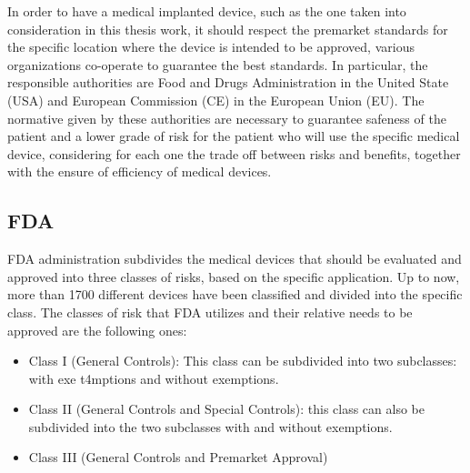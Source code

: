 \documentclass{Configuration_Files/PoliMi3i_thesis}
\begin{document}
In order to have a medical implanted device, such as the one taken into consideration in this thesis work, it should respect the premarket standards for the specific location where the device is intended to be approved, various organizations co-operate to guarantee the best standards. \cite{UWBioEUniversity2021} In particular, the responsible authorities are Food and Drugs Administration in the United State (USA) and European Commission (CE) in the European Union (EU). 
The normative given by these authorities are necessary to guarantee safeness of the patient and a lower grade of risk for the patient who will use the specific medical device, considering for each one the trade off between risks and benefits, together with the ensure of efficiency of medical devices.

\subsection{FDA}

FDA administration subdivides the medical devices that should be evaluated and approved into three classes of risks, based on the specific application. Up to now, more than 1700 different devices have been classified and divided into the specific class. \cite{healthClassifyYourMedical2023}
The classes of risk that FDA utilizes and their relative needs to be approved are the following ones: 
\begin{itemize}

	\item  Class I (General Controls): This class can be subdivided into two subclasses: with exe        t4mptions and without exemptions.
	\item  Class II (General Controls and Special Controls): this class can also be subdivided into the two subclasses with and without exemptions.
	\item  Class III (General Controls and Premarket Approval)

\end{itemize}
\end{document}
